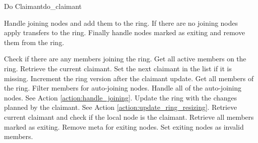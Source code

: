 \begin{actionbox}{Do Claimant}{do_claimant}
	\begin{action}
		 Handle joining nodes and add them to the ring.
		If there are no joining nodes apply transfers to the ring.
		Finally handle nodes marked as exiting and remove them from the ring.
		\begin{action}
			 Check if there are any members joining the ring.
			 Get all active members on the ring.
			 Retrieve the current claimant.
			 Set the next claimant in the list if it is missing.
			 Increment the ring version after the claimant update.
			 Get all members of the ring.
			 Filter members for auto-joining nodes.
			 Handle all of the auto-joining nodes. See Action \ref{action:handle_joining}.
			 Update the ring with the changes planned by the claimant. See Action \ref{action:update_ring_resizing}.
			 Retrieve current claimant and check if the local node is the claimant.
			 Retrieve all members marked as exiting.
			 Remove meta for exiting nodes.
			 Set exiting nodes as invalid members.
		\end{action}
	\end{action}
\end{actionbox}


